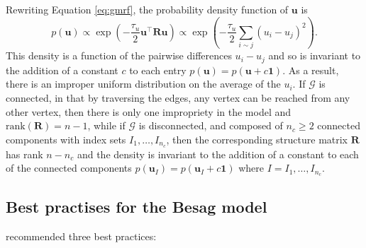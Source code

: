 \documentclass[a4paper, nobind]{templates/ociamthesis}
\begin{document}
Rewriting Equation \eqref{eq:gmrf}, the probability density function of \(\mathbf{u}\) is
\begin{equation}
    p(\mathbf{u})
    \propto \exp \left( -\frac{\tau_u}{2} \mathbf{u}^\top \mathbf{R} \mathbf{u} \right)
    \propto \exp \left( -\frac{\tau_u}{2} \sum_{i \sim j} (u_i - u_j)^2 \right). \label{eq:pdfu}
\end{equation}
This density is a function of the pairwise differences \(u_i - u_j\) and so is invariant to the addition of a constant \(c\) to each entry \(p(\mathbf{u}) = p(\mathbf{u} + c\mathbf{1})\).
As a result, there is an improper uniform distribution on the average of the \(u_i\).
If \(\mathcal{G}\) is connected, in that by traversing the edges, any vertex can be reached from any other vertex, then there is only one impropriety in the model and \(\text{rank}(\mathbf{R}) = n - 1\), while if \(\mathcal{G}\) is disconnected, and composed of \(n_c \geq 2\) connected components with index sets \(I_1, \ldots, I_{n_c}\), then the corresponding structure matrix \(\mathbf{R}\) has rank \(n - n_c\) and the density is invariant to the addition of a constant to each of the connected components \(p(\mathbf{u}_{I}) = p(\mathbf{u}_{I} + c\mathbf{1})\) where \(I = I_1, \ldots, I_{n_c}\).

\hypertarget{best-practises-for-the-besag-model}{%
\subsection{Best practises for the Besag model}\label{best-practises-for-the-besag-model}}

\textcite{freni2018note} recommended three best practices:
\end{document}
